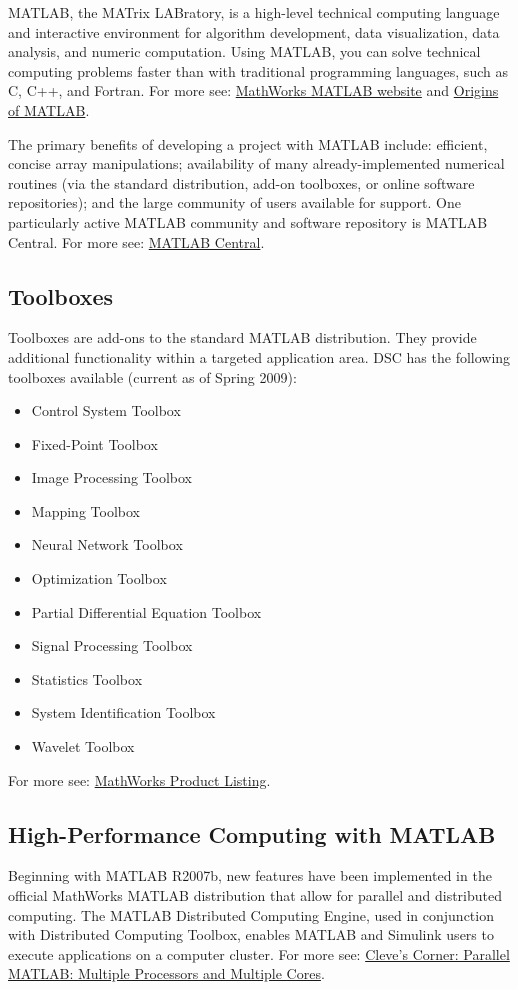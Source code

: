 \documentclass[12pt,a4paper]{article}
\begin{document}
MATLAB, the MATrix LABratory, is a high-level technical computing language and interactive environment for algorithm development, data visualization, data analysis, and numeric computation. Using MATLAB, you can solve technical computing problems faster than with traditional programming languages, such as C, C++, and Fortran. For more see: \href{https://www.mathworks.com/products/matlab.html}{MathWorks MATLAB website} and \href{https://www.mathworks.com/company/newsletters/articles/the-origins-of-matlab.html}{Origins of MATLAB}.

The primary benefits of developing a project with MATLAB include: efficient, concise array manipulations; availability of many already-implemented numerical routines (via the standard distribution, add-on toolboxes, or online software repositories); and the large community of users available for support. One particularly active MATLAB community and software repository is MATLAB Central. For more see: \href{https://www.mathworks.com/matlabcentral/}{MATLAB Central}.

\subsection*{Toolboxes}
Toolboxes are add-ons to the standard MATLAB distribution. They provide additional functionality within a targeted application area. DSC has the following toolboxes available (current as of Spring 2009):
\begin{itemize}
    \item Control System Toolbox
    \item Fixed-Point Toolbox
    \item Image Processing Toolbox
    \item Mapping Toolbox
    \item Neural Network Toolbox
    \item Optimization Toolbox
    \item Partial Differential Equation Toolbox
    \item Signal Processing Toolbox
    \item Statistics Toolbox
    \item System Identification Toolbox
    \item Wavelet Toolbox
\end{itemize}
For more see: \href{https://www.mathworks.com/products.html}{MathWorks Product Listing}.

\subsection*{High-Performance Computing with MATLAB}
Beginning with MATLAB R2007b, new features have been implemented in the official MathWorks MATLAB distribution that allow for parallel and distributed computing. The MATLAB Distributed Computing Engine, used in conjunction with Distributed Computing Toolbox, enables MATLAB and Simulink users to execute applications on a computer cluster. For more see: \href{https://www.mathworks.com/company/newsletters/articles/parallel-matlab-multiple-processors-and-multiple-cores.html}{Cleve's Corner: Parallel MATLAB: Multiple Processors and Multiple Cores}.
\end{document}
